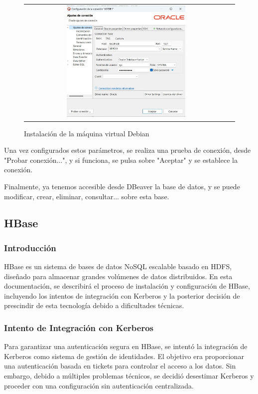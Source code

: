 \documentclass{article}
\begin{document}
\begin{figure}[H]
    \centering
    \begin{tabular}{c c}  %
    \includegraphics[width=0.6\textwidth]{configuracion_ajustes_conexion_oracle.png}
    \end{tabular}
    \caption{Instalación de la máquina virtual Debian}
    \label{fig:Configuración DBeaver de Oracle}
\end{figure}

Una vez configurados estos parámetros, se realiza una prueba de conexión, desde "Probar conexión...", y si funciona, se pulsa sobre "Aceptar" y se establece la conexión. 

Finalmente, ya tenemos accesible desde DBeaver la base de datos, y se puede modificar, crear, eliminar, consultar... sobre esta base. 


\newpage
\subsection{HBase}
\subsubsection{Introducción}
HBase es un sistema de bases de datos NoSQL escalable basado en HDFS, diseñado para almacenar grandes volúmenes de datos distribuidos. En esta documentación, se describirá el proceso de instalación y configuración de HBase, incluyendo los intentos de integración con Kerberos y la posterior decisión de prescindir de esta tecnología debido a dificultades técnicas.

\subsubsection{Intento de Integración con Kerberos}
Para garantizar una autenticación segura en HBase, se intentó la integración de Kerberos como sistema de gestión de identidades. El objetivo era proporcionar una autenticación basada en tickets para controlar el acceso a los datos. Sin embargo, debido a múltiples problemas técnicos, se decidió desestimar Kerberos y proceder con una configuración sin autenticación centralizada.
\end{document}
